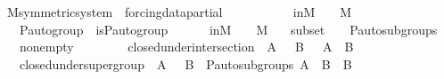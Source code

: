 \begin{isabellebody}
\isanewline
{}\isamarkupfalse%
\isanewline
\isanewline
{}\isamarkupfalse%
\ M{\isacharunderscore}{\kern0pt}symmetric{\isacharunderscore}{\kern0pt}system\ {\isacharequal}{\kern0pt}\ forcing{\isacharunderscore}{\kern0pt}data{\isacharunderscore}{\kern0pt}partial\ {\isacharplus}{\kern0pt}\ \isanewline
\ \ \ {\isasymG}\ {\isasymF}\ \isanewline
\ \ \ {\isasymG}{\isacharunderscore}{\kern0pt}in{\isacharunderscore}{\kern0pt}M\ {\isacharcolon}{\kern0pt}\ {\isachardoublequoteopen}{\isasymG}\ {\isasymin}\ M{\isachardoublequoteclose}\ \ \isanewline
\ \ \ {\isasymG}{\isacharunderscore}{\kern0pt}P{\isacharunderscore}{\kern0pt}auto{\isacharunderscore}{\kern0pt}group\ {\isacharcolon}{\kern0pt}\ {\isachardoublequoteopen}is{\isacharunderscore}{\kern0pt}P{\isacharunderscore}{\kern0pt}auto{\isacharunderscore}{\kern0pt}group{\isacharparenleft}{\kern0pt}{\isasymG}{\isacharparenright}{\kern0pt}{\isachardoublequoteclose}\ \ \ \isanewline
\ \ \ {\isasymF}{\isacharunderscore}{\kern0pt}in{\isacharunderscore}{\kern0pt}M\ {\isacharcolon}{\kern0pt}\ {\isachardoublequoteopen}{\isasymF}\ {\isasymin}\ M{\isachardoublequoteclose}\isanewline
\ \ \ {\isasymF}{\isacharunderscore}{\kern0pt}subset\ {\isacharcolon}{\kern0pt}\ {\isachardoublequoteopen}{\isasymF}\ {\isasymsubseteq}\ P{\isacharunderscore}{\kern0pt}auto{\isacharunderscore}{\kern0pt}subgroups{\isacharparenleft}{\kern0pt}{\isasymG}{\isacharparenright}{\kern0pt}{\isachardoublequoteclose}\ \isanewline
\ \ \ {\isasymF}{\isacharunderscore}{\kern0pt}nonempty\ {\isacharcolon}{\kern0pt}\ {\isachardoublequoteopen}{\isasymF}\ {\isasymnoteq}\ {}{\isachardoublequoteclose}\ \isanewline
\ \ \ {\isasymF}{\isacharunderscore}{\kern0pt}closed{\isacharunderscore}{\kern0pt}under{\isacharunderscore}{\kern0pt}intersection\ {\isacharcolon}{\kern0pt}\ {\isachardoublequoteopen}{\isasymforall}A\ {\isasymin}\ {\isasymF}{\isachardot}{\kern0pt}\ {\isasymforall}B\ {\isasymin}\ {\isasymF}{\isachardot}{\kern0pt}\ A\ {\isasyminter}\ B\ {\isasymin}\ {\isasymF}{\isachardoublequoteclose}\ \isanewline
\ \ \ {\isasymF}{\isacharunderscore}{\kern0pt}closed{\isacharunderscore}{\kern0pt}under{\isacharunderscore}{\kern0pt}supergroup\ {\isacharcolon}{\kern0pt}\ {\isachardoublequoteopen}{\isasymforall}A\ {\isasymin}\ {\isasymF}{\isachardot}{\kern0pt}\ {\isasymforall}B\ {\isasymin}\ P{\isacharunderscore}{\kern0pt}auto{\isacharunderscore}{\kern0pt}subgroups{\isacharparenleft}{\kern0pt}{\isasymG}{\isacharparenright}{\kern0pt}{\isachardot}{\kern0pt}\ A\ {\isasymsubseteq}\ B\ {\isasymlongrightarrow}\ B\ {\isasymin}\ {\isasymF}{\isachardoublequoteclose}\ \isanewline

\end{isabellebody}
